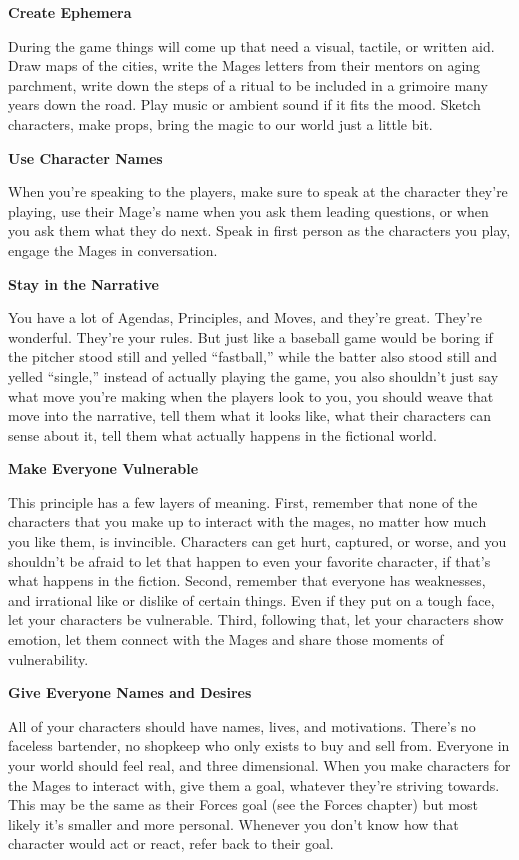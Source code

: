 \documentclass[
  oneside,
  statementpaper,
  9pt]{memoir}
\begin{document}
\textbf{Create Ephemera}

During the game things will come up that need a visual, tactile, or
written aid. Draw maps of the cities, write the Mages letters from their
mentors on aging parchment, write down the steps of a ritual to be
included in a grimoire many years down the road. Play music or ambient
sound if it fits the mood. Sketch characters, make props, bring the
magic to our world just a little bit.

\textbf{Use Character Names}

When you're speaking to the players, make sure to speak at the character
they're playing, use their Mage's name when you ask them leading
questions, or when you ask them what they do next. Speak in first person
as the characters you play, engage the Mages in conversation.

\textbf{Stay in the Narrative}

You have a lot of Agendas, Principles, and Moves, and they're great.
They're wonderful. They're your rules. But just like a baseball game
would be boring if the pitcher stood still and yelled ``fastball,''
while the batter also stood still and yelled ``single,'' instead of
actually playing the game, you also shouldn't just say what move you're
making when the players look to you, you should weave that move into the
narrative, tell them what it looks like, what their characters can sense
about it, tell them what actually happens in the fictional world.

\textbf{Make Everyone Vulnerable}

This principle has a few layers of meaning. First, remember that none of
the characters that you make up to interact with the mages, no matter
how much you like them, is invincible. Characters can get hurt,
captured, or worse, and you shouldn't be afraid to let that happen to
even your favorite character, if that's what happens in the fiction.
Second, remember that everyone has weaknesses, and irrational like or
dislike of certain things. Even if they put on a tough face, let your
characters be vulnerable. Third, following that, let your characters
show emotion, let them connect with the Mages and share those moments of
vulnerability.

\textbf{Give Everyone Names and Desires}

All of your characters should have names, lives, and motivations.
There's no faceless bartender, no shopkeep who only exists to buy and
sell from. Everyone in your world should feel real, and three
dimensional. When you make characters for the Mages to interact with,
give them a goal, whatever they're striving towards. This may be the
same as their Forces goal (see the Forces chapter) but most likely it's
smaller and more personal. Whenever you don't know how that character
would act or react, refer back to their goal.
\end{document}
